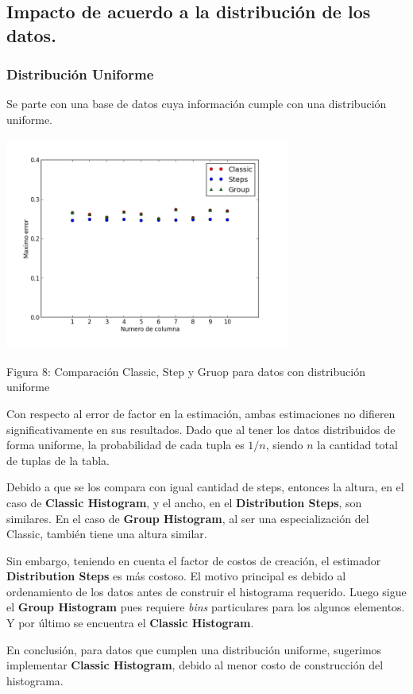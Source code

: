 \documentclass[10pt, a4paper,english,spanish,hidelinks]{article}
\begin{document}
\subsection{Impacto de acuerdo a la distribución de los datos.}
\subsubsection{Distribución Uniforme}

Se parte con una base de datos cuya información cumple con una distribución uniforme.

\centerline{  \includegraphics[width=0.7\textwidth]{./imagenes/ejb3_uniforme.png}}
\centerline{Figura 8: Comparación Classic, Step y Gruop para datos con distribución uniforme}

Con respecto al error de factor en la estimación, ambas estimaciones no difieren
significativamente en sus resultados. Dado que al tener los datos distribuidos de forma
uniforme, la probabilidad de cada tupla es $1/n$, siendo $n$ la cantidad total de tuplas de la tabla.

Debido a que se los compara con igual cantidad de steps, entonces la altura, en el caso de
\textbf{Classic Histogram}, y el ancho, en el \textbf{Distribution Steps}, son similares.
En el caso de \textbf{Group Histogram}, al ser una especialización del Classic, también tiene
una altura similar.

Sin embargo, teniendo en cuenta el factor de costos de creación, el estimador
\textbf{Distribution Steps} es más costoso. El motivo principal es debido al ordenamiento
de los datos antes de construir el histograma requerido. Luego sigue el \textbf{Group Histogram}
pues requiere \textit{bins} particulares para los algunos elementos. Y por último se encuentra el \textbf{Classic Histogram}.

En conclusión, para datos que cumplen una distribución uniforme, sugerimos implementar
\textbf{Classic Histogram}, debido al menor costo de construcción del histograma.
\end{document}
